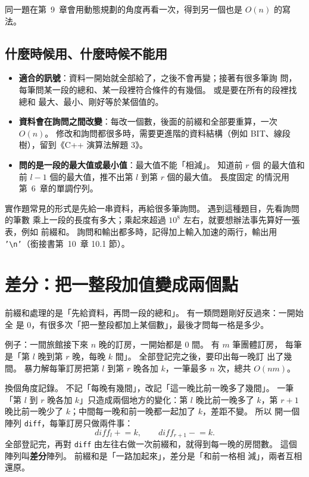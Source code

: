 同一題在第~9~章會用動態規劃的角度再看一次，得到另一個也是 $O(n)$ 的寫法。

\subsection{什麼時候用、什麼時候不能用}

\begin{itemize}
\item \textbf{適合的訊號}：資料一開始就全部給了，之後不會再變；接著有很多筆詢
問，每筆問某一段的總和、某一段裡符合條件的有幾個。 或是要在所有的段裡找總和
最大、最小、剛好等於某個值的。
\item \textbf{資料會在詢問之間改變}：每改一個數，後面的前綴和全部要重算，一次
$O(n)$。 修改和詢問都很多時，需要更進階的資料結構（例如 BIT、線段樹），留到《C++ 演算法解題 3》。
\item \textbf{問的是一段的最大值或最小值}：最大值不能「相減」。 知道前 $r$ 個
的最大值和前 $l - 1$ 個的最大值，推不出第 $l$ 到第 $r$ 個的最大值。 長度固定
的情況用第~6~章的單調佇列。
\end{itemize}

\begin{apcsnote}
實作題常見的形式是先給一串資料，再給很多筆詢問。 遇到這種題目，先看詢問的筆數
乘上一段的長度有多大；乘起來超過 $10^8$ 左右，就要想辦法事先算好一張表，例如
前綴和。 詢問和輸出都多時，記得加上輸入加速的兩行，輸出用
\texttt{'\textbackslash n'}（銜接書第~10~章 10.1 節）。
\end{apcsnote}

\section{差分：把一整段加值變成兩個點}
\label{sec:ps-diff}

前綴和處理的是「先給資料，再問一段的總和」。 有一類問題剛好反過來：一開始全
是 $0$，有很多次「把一整段都加上某個數」，最後才問每一格是多少。

例子：一間旅館接下來 $n$ 晚的訂房，一開始都是 $0$ 間。 有 $m$ 筆團體訂房，
每筆是「第 $l$ 晚到第 $r$ 晚，每晚 $k$ 間」。 全部登記完之後，要印出每一晚訂
出了幾間。 暴力解每筆訂房把第 $l$ 到第 $r$ 晚各加 $k$，一筆最多 $n$ 次，總共
$O(nm)$。

換個角度記錄。 不記「每晚有幾間」，改記「這一晚比前一晚多了幾間」。 一筆「第
$l$ 到 $r$ 晚各加 $k$」只造成兩個地方的變化：第 $l$ 晚比前一晚多了 $k$，第
$r + 1$ 晚比前一晚少了 $k$；中間每一晚和前一晚都一起加了 $k$，差距不變。 所以
開一個陣列 \texttt{diff}，每筆訂房只做兩件事：
\[
diff_l \mathrel{+}= k, \qquad diff_{r+1} \mathrel{-}= k .
\]
全部登記完，再對 \texttt{diff} 由左往右做一次前綴和，就得到每一晚的房間數。
這個陣列叫\textbf{差分}陣列。 前綴和是「一路加起來」，差分是「和前一格相
減」，兩者互相還原。

